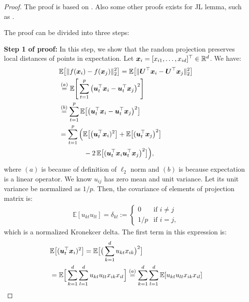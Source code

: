 \documentclass{article}
\def\b{\ensuremath\boldsymbol}
\begin{document}
\begin{proof}
The proof is based on \cite{karimi2018exploring,indyk1998approximate,dasgupta1999elementary,dasgupta2003elementary,achlioptas2003database,achlioptas2001database,matouvsek2008variants}.
Also some other proofs exists for JL lemma, such as \cite{frankl1988johnson,arriaga1999algorithmic}. 

\hfill \break
The proof can be divided into three steps:

\textbf{Step 1 of proof:} 
In this step, we show that the random projection preserves local distances of points in expectation.
Let $\b{x}_i = [x_{i1}, \dots, x_{id}]^\top \in \mathbb{R}^d$. We have:
\begin{align}
&\mathbb{E}\big[\|f(\b{x}_i) - f(\b{x}_j)\|_2^2\big] = \mathbb{E}\big[\|\b{U}^\top \b{x}_i - \b{U}^\top \b{x}_j\|_2^2\big] \nonumber\\
&\overset{(a)}{=} \mathbb{E}\Bigg[\sum_{t=1}^p \big(\b{u}_t^\top \b{x}_i - \b{u}_t^\top \b{x}_j\big)^2\Bigg] \nonumber\\
&\overset{(b)}{=} \sum_{t=1}^p \mathbb{E}\big[\big(\b{u}_t^\top \b{x}_i - \b{u}_t^\top \b{x}_j\big)^2\big] \nonumber\\
&= \sum_{t=1}^p \Big( \mathbb{E}\big[\big(\b{u}_t^\top \b{x}_i)^2\big] + \mathbb{E}\big[(\b{u}_t^\top \b{x}_j\big)^2\big] \nonumber\\
&~~~~~~~~~~~ - 2\,\mathbb{E}\big[(\b{u}_t^\top \b{x}_i \b{u}_t^\top \b{x}_j\big)^2\big] \Big), \label{equation_expectation_difference_of_mapping}
\end{align}
where $(a)$ is because of definition of $\ell_2$ norm and $(b)$ is because expectation is a linear operator. 
We know $u_{ij}$ has zero mean and unit variance. Let its unit variance be normalized as $1/p$. Then, the covariance of elements of projection matrix is:
\begin{align}\label{equation_covariance_of_projection_matrix}
\mathbb{E}[u_{kt} u_{lt}] = \delta_{kl} := 
\left\{
    \begin{array}{ll}
        0 & \mbox{if } i \neq j \\
        1/p & \mbox{if } i = j,
    \end{array}
\right.
\end{align}
which is a normalized Kronekcer delta.
The first term in this expression is:
\begin{align*}
&\mathbb{E}\big[(\b{u}_t^\top \b{x}_i)^2\big] = \mathbb{E}\big[\big(\sum_{k=1}^d u_{kt} x_{ik}\big)^2\big] \\
&= \mathbb{E}\Big[\sum_{k=1}^d \sum_{l=1}^d u_{kt} u_{lt} x_{ik} x_{il}\Big] \overset{(a)}{=} \sum_{k=1}^d \sum_{l=1}^d \mathbb{E}[u_{kt} u_{lt} x_{ik} x_{il}] \\

\end{align*}
\end{proof}
\end{document}

